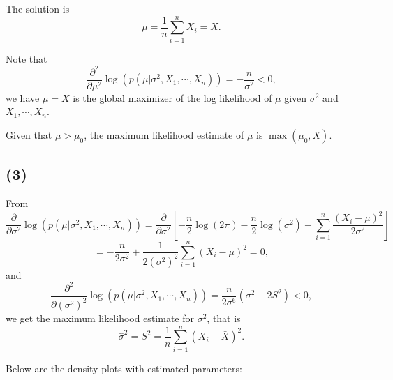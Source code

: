 \documentclass{article}
\begin{document}
{{        The solution is $$\mu = \frac{1}{n} \sum_{i=1}^{n} X_i = \bar{X}.$$

        Note that $$\frac{\partial^2}{\partial \mu^2} \log{(p(\mu | \sigma^2, X_1, \cdots, X_n))} = - \frac{n}{\sigma^2} < 0,$$ we have $\mu = \bar{X}$ is the global maximizer of the log likelihood of $\mu$ given $\sigma^2$ and $X_1, \cdots, X_n$.

        Given that $\mu > \mu_0$, the maximum likelihood estimate of $\mu$ is $\max{(\mu_0, \bar{X})}$.
    }

    \subsection*{(3)}
    {
        From $$\frac{\partial}{\partial \sigma^2} \log{(p(\mu | \sigma^2, X_1, \cdots, X_n))} = \frac{\partial}{\partial \sigma^2} \left[ -\frac{n}{2} \log{(2\pi)} - \frac{n}{2} \log{(\sigma^2)} - \sum_{i=1}^{n} {\frac{(X_i - \mu)^2}{2\sigma^2}} \right] $$$$= -\frac{n}{2\sigma^2} + \frac{1}{2(\sigma^2)^2} \sum_{i=1}^{n} {(X_i -\mu)^2} = 0,$$
        and $$\frac{\partial^2}{\partial (\sigma^2)^2} \log{(p(\mu | \sigma^2, X_1, \cdots, X_n))} = \frac{n}{2\sigma^6}(\sigma^2 - 2 S^2) < 0,$$ we get the maximum likelihood estimate for $\sigma^2$, that is 
        $$\hat{\sigma}^2 = S^2 = \frac{1}{n} \sum_{i=1}^{n} {(X_i - \bar{X})^2}.$$

        Below are the density plots with estimated parameters:

}}
\end{document}
